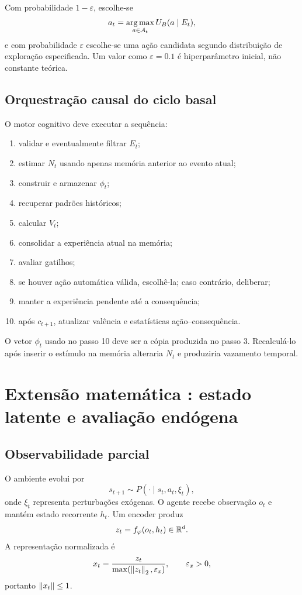 Com probabilidade \(1-\varepsilon\), escolhe-se
\begin{equation}
a_t=\operatorname*{arg\,max}_{a\in\mathcal A_t}U_B(a\mid E_t),
\end{equation}
e com probabilidade \(\varepsilon\) escolhe-se uma ação candidata segundo distribuição de exploração especificada. Um valor como \(\varepsilon=0.1\) é hiperparâmetro inicial, não constante teórica.

\subsection{Orquestração causal do ciclo basal}

O motor cognitivo deve executar a sequência:
\begin{enumerate}
\item validar e eventualmente filtrar \(E_t\);
\item estimar \(N_t\) usando apenas memória anterior ao evento atual;
\item construir e armazenar \(\phi_t\);
\item recuperar padrões históricos;
\item calcular \(V_t\);
\item consolidar a experiência atual na memória;
\item avaliar gatilhos;
\item se houver ação automática válida, escolhê-la; caso contrário, deliberar;
\item manter a experiência pendente até a consequência;
\item após \(c_{t+1}\), atualizar valência e estatísticas ação--consequência.
\end{enumerate}

O vetor \(\phi_t\) usado no passo 10 deve ser a cópia produzida no passo 3. Recalculá-lo após inserir o estímulo na memória alteraria \(N_t\) e produziria vazamento temporal.

\section{Extensão matemática \EVPM: estado latente e avaliação endógena}

\subsection{Observabilidade parcial}

O ambiente evolui por
\begin{equation}
s_{t+1}\sim P(\cdot\mid s_t,a_t,\xi_t),
\end{equation}
onde \(\xi_t\) representa perturbações exógenas. O agente recebe observação \(o_t\) e mantém estado recorrente \(h_t\). Um encoder produz
\begin{equation}
z_t=f_\varphi(o_t,h_t)\in\mathbb{R}^d.
\end{equation}
A representação normalizada é
\begin{equation}
x_t=\frac{z_t}{\max(\left\lVert z_t \right\rVert_2,\varepsilon_x)},
\qquad \varepsilon_x>0,
\label{eq:latent_norm}
\end{equation}
portanto \(\left\lVert x_t \right\rVert\le1\).


